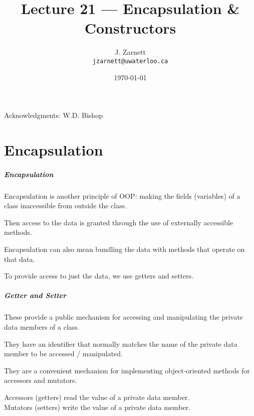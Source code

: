

\title{Lecture 21 --- Encapsulation \& Constructors}

\author{J. Zarnett\\
\texttt{jzarnett@uwaterloo.ca}}
\date{\today}



\begin{frame}
  \titlepage
  
  \begin{center}
  \small{Acknowledgments: W.D. Bishop}
  \end{center}
\end{frame}

\part{Encapsulation}
\begin{frame}\partpage\end{frame}

\begin{frame}
\frametitle{Encapsulation}
\alert{Encapsulation} is another principle of OOP: making the fields (variables) of a class inaccessible from outside the class.

Then access to the data is granted through the use of externally accessible methods.

Encapsulation can also mean bundling the data with methods that operate on that data.

To provide access to just the data, we use \alert{getter}s and \alert{setter}s.

\end{frame}


\begin{frame}
\frametitle{Getter and Setter}

These provide a public mechanism for accessing and manipulating the private data members of a class.

They have an identifier that normally matches the name of the private data member to be accessed / manipulated.

They are a convenient mechanism for implementing object-oriented methods for accessors and mutators.

\alert{Accessors} (getters) read the value of a private data member.\\
\alert{Mutators} (setters) write the value of a private data member.

\end{frame}

